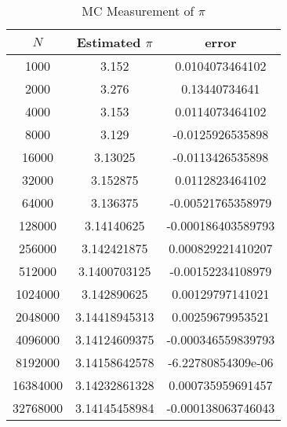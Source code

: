 \begin{table}[h]
\centering
\begin{tabular}{ccc}
\hline\hline
$N$ & Estimated $\pi$ & error \\
\hline
1000 & 3.152 & 0.0104073464102 \\
2000 & 3.276 & 0.13440734641 \\
4000 & 3.153 & 0.0114073464102 \\
8000 & 3.129 & -0.0125926535898 \\
16000 & 3.13025 & -0.0113426535898 \\
32000 & 3.152875 & 0.0112823464102 \\
64000 & 3.136375 & -0.00521765358979 \\
128000 & 3.14140625 & -0.000186403589793 \\
256000 & 3.142421875 & 0.000829221410207 \\
512000 & 3.1400703125 & -0.00152234108979 \\
1024000 & 3.142890625 & 0.00129797141021 \\
2048000 & 3.14418945313 & 0.00259679953521 \\
4096000 & 3.14124609375 & -0.000346559839793 \\
8192000 & 3.14158642578 & -6.22780854309e-06 \\
16384000 & 3.14232861328 & 0.000735959691457 \\
32768000 & 3.14145458984 & -0.000138063746043 \\
\hline\hline
\end{tabular}
\label{tb1}
\caption{MC Measurement of $\pi$}
\end{table}
